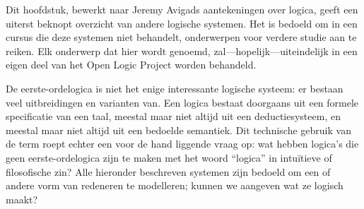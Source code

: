 \documentclass[openany]{memoir}
\begin{document}
\begingroup
\def\olfilename{OLP-0174}
\def\olfilepath{content/first-order-logic/beyond/}
\hypertarget{unit-OLP-0174}{}




\begin{editorial}
  Dit hoofdstuk, bewerkt naar Jeremy Avigads aantekeningen over logica,
  geeft een uiterst beknopt overzicht van andere logische systemen. Het
  is bedoeld om in een cursus die deze systemen niet behandelt,
  onderwerpen voor verdere studie aan te reiken. Elk onderwerp dat
  hier wordt genoemd, zal---hopelijk---uiteindelijk in een eigen deel
  van het Open Logic Project worden behandeld.
\end{editorial}
\endgroup

\begingroup
\def\olfilename{OLP-0175}
\def\olfilepath{content/first-order-logic/beyond/}
\hypertarget{unit-OLP-0175}{}





De eerste-ordelogica is niet het enige interessante logische systeem:
er bestaan veel uitbreidingen en varianten van. Een logica bestaat
doorgaans uit een formele specificatie van een taal, meestal maar niet
altijd uit een deductiesysteem, en meestal maar niet altijd uit een
bedoelde semantiek. Dit technische gebruik van de term roept echter een
voor de hand liggende vraag op: wat hebben logica's die geen
eerste-ordelogica zijn te maken met het woord ``logica'' in intuïtieve
of filosofische zin? Alle hieronder beschreven systemen zijn bedoeld
om een of andere vorm van redeneren te modelleren; kunnen we aangeven
wat ze logisch maakt?
\end{document}
